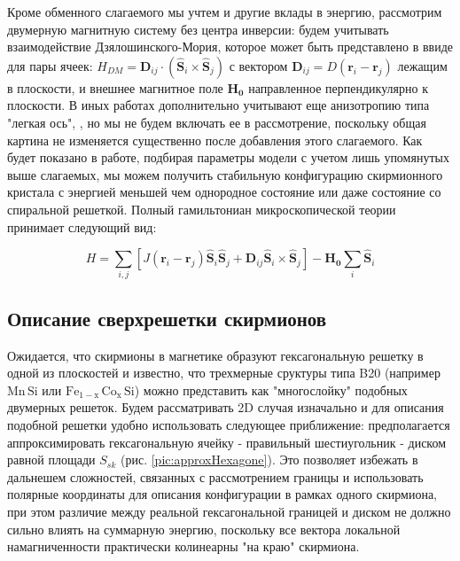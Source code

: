 \documentclass[a4paper,article,14pt]{extarticle}
\begin{document}
Кроме обменного слагаемого мы учтем и другие вклады в энергию, рассмотрим двумерную магнитную систему без центра инверсии: будем учитывать взаимодействие Дзялошинского-Мория, которое может быть представлено в ввиде для пары ячеек: ${H_{DM}} = {{\mathbf{D}}_{ij}} \cdot \left( {\widehat {\mathbf{S}}}_{i} \times {{\widehat {\mathbf{S}}}_j} \right) $ \cite{paper:lacrox}
с вектором $\mathbf{D}_{ij} = D \left(\mathbf{r}_i - \mathbf{r}_j \right)$ лежащим в плоскости, и внешнее магнитное поле $\mathbf{H_0}$ направленное перпендикулярно к плоскости. В иных работах дополнительно учитывают еще анизотропию типа "легкая ось", \cite{paper:bogdanov}, но мы не будем включать ее в рассмотрение, поскольку общая картина не изменяется существенно после добавления этого слагаемого. Как будет показано в работе, подбирая параметры модели с учетом лишь упомянутых выше слагаемых, мы можем получить стабильную конфигурацию скирмионного кристала с энергией меньшей чем однородное состояние или даже состояние со спиральной решеткой. Полный гамильтониан микроскопической теории принимает следующий вид:

\begin{equation}
\label{eq:ham}	
H = \sum\limits_{i,j} {\left[ {J\left( {{{\mathbf{r}}_i} - {{\mathbf{r}}_j}} \right){{\widehat {\mathbf{S}}}_i}{{\widehat {\mathbf{S}}}_j} + {{\mathbf{D}}_{ij}}  {{\widehat {\mathbf{S}}}_i} \times {{\widehat {\mathbf{S}}}_j}} \right] - {\mathbf{H_0}}} \sum\limits_{i} {{{\widehat {\mathbf{S}}}_i}}
\end{equation}


\subsection{Описание сверхрешетки скирмионов}
Ожидается, что скирмионы в магнетике образуют гексагональную решетку в одной из плоскостей \cite{paper:muhlbauer, paper:yu} и известно, что трехмерные сруктуры типа B20 (например $\mathrm{Mn\,Si}$ или $\mathrm{Fe_{1-x}\,Co_x\,Si}$) можно представить как "многослойку" подобных двумерных решеток. Будем рассматривать 2D случая изначально и для описания подобной решетки удобно использовать следующее приближение: предполагается аппроксимировать гексагональную ячейку - правильный шестиугольник - диском равной площади $S_{sk}$ (рис. \ref{pic:approxHexagone}). Это позволяет избежать в дальнешем сложностей, связанных с рассмотрением границы и использовать полярные координаты для описания конфигурации в рамках одного скирмиона, при этом различие между реальной гексагональной границей и диском не должно сильно влиять на суммарную энергию, поскольку все вектора локальной намагниченности практически колинеарны "на краю" скирмиона.
\end{document}
